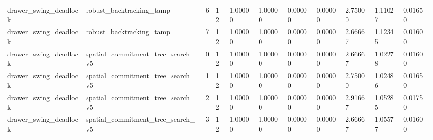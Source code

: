 \documentclass{article}
\begin{document}
\begin{table}[tbp]
{\begin{tabular}{lllllllllll}
drawer\_swing\_deadlock & robust\_backtracking\_tamp & 6 & 12 & 1.00000 & 1.00000 & 0.00000 & 0.00000 & 2.75000 & 1.11027 & 0.01650 \\
drawer\_swing\_deadlock & robust\_backtracking\_tamp & 7 & 12 & 1.00000 & 1.00000 & 0.00000 & 0.00000 & 2.66667 & 1.12345 & 0.01600 \\
drawer\_swing\_deadlock & spatial\_commitment\_tree\_search\_v5 & 0 & 12 & 1.00000 & 1.00000 & 0.00000 & 0.00000 & 2.66667 & 1.02278 & 0.01600 \\
drawer\_swing\_deadlock & spatial\_commitment\_tree\_search\_v5 & 1 & 12 & 1.00000 & 1.00000 & 0.00000 & 0.00000 & 2.75000 & 1.02486 & 0.01650 \\
drawer\_swing\_deadlock & spatial\_commitment\_tree\_search\_v5 & 2 & 12 & 1.00000 & 1.00000 & 0.00000 & 0.00000 & 2.91667 & 1.05285 & 0.01750 \\
drawer\_swing\_deadlock & spatial\_commitment\_tree\_search\_v5 & 3 & 12 & 1.00000 & 1.00000 & 0.00000 & 0.00000 & 2.66667 & 1.05577 & 0.01600 \\
\bottomrule
\end{tabular}
}
\end{table}

\clearpage
\end{document}

